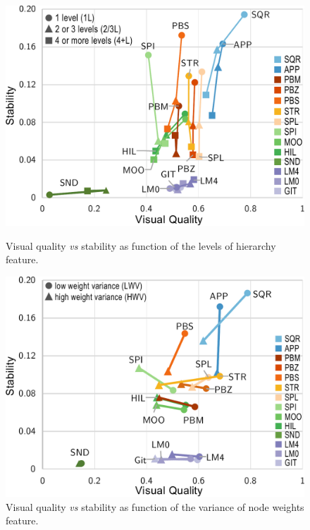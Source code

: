 \begin{figure}[t]
\begin{minipage}{0.475\textwidth}
 \centering
    \includegraphics[width=\linewidth]{figures/treemap-evaluation/DepthPlot}
    \caption{Visual quality \emph{vs} stability as function of the levels of hierarchy feature.}
    \label{fig:depth}
\end{minipage}
\hfill
\begin{minipage}{0.475\textwidth}
\centering
    \includegraphics[width=\linewidth]{figures/treemap-evaluation/weightVariancePlot}
    \caption{Visual quality \emph{vs} stability as function of the variance of node weights feature.}
    \label{fig:weightVariance}
\end{minipage}
\end{figure}

